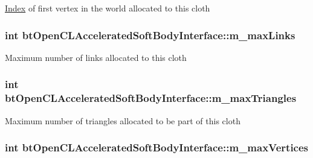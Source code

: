 \hyperlink{struct_index}{Index} of first vertex in the world allocated to this cloth \hypertarget{classbt_open_c_l_accelerated_soft_body_interface_a52e623365139c2d6b2833acb77415804}{
\subsubsection[{m\+\_\+max\+Links}]{\setlength{\rightskip}{0pt plus 5cm}int bt\+Open\+C\+L\+Accelerated\+Soft\+Body\+Interface\+::m\+\_\+max\+Links\hspace{0.3cm}{\ttfamily [protected]}}}\label{classbt_open_c_l_accelerated_soft_body_interface_a52e623365139c2d6b2833acb77415804}
Maximum number of links allocated to this cloth \hypertarget{classbt_open_c_l_accelerated_soft_body_interface_aef48706f7d1d803817a12c2594956420}{
\subsubsection[{m\+\_\+max\+Triangles}]{\setlength{\rightskip}{0pt plus 5cm}int bt\+Open\+C\+L\+Accelerated\+Soft\+Body\+Interface\+::m\+\_\+max\+Triangles\hspace{0.3cm}{\ttfamily [protected]}}}\label{classbt_open_c_l_accelerated_soft_body_interface_aef48706f7d1d803817a12c2594956420}
Maximum number of triangles allocated to be part of this cloth \hypertarget{classbt_open_c_l_accelerated_soft_body_interface_a22315dd7b0bb4cb93f54c9a5fc8e8bd4}{
\subsubsection[{m\+\_\+max\+Vertices}]{\setlength{\rightskip}{0pt plus 5cm}int bt\+Open\+C\+L\+Accelerated\+Soft\+Body\+Interface\+::m\+\_\+max\+Vertices\hspace{0.3cm}{\ttfamily [protected]}}}\label{classbt_open_c_l_accelerated_soft_body_interface_a22315dd7b0bb4cb93f54c9a5fc8e8bd4}
